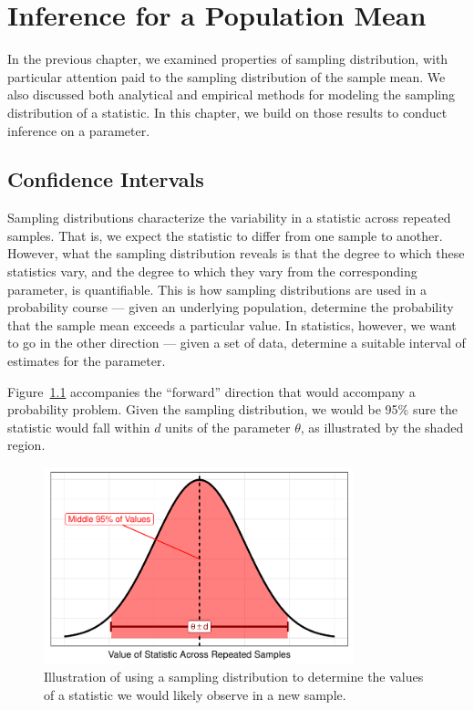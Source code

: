 \documentclass[
  letterpaper,
  DIV=11,
  numbers=noendperiod]{scrreprt}
\theoremstyle{plain}
\theoremstyle{definition}
\theoremstyle{definition}
\theoremstyle{remark}
\begin{document}

\hypertarget{sec-inference}{%
\chapter{Inference for a Population Mean}\label{sec-inference}}

In the previous chapter, we examined properties of sampling
distribution, with particular attention paid to the sampling
distribution of the sample mean. We also discussed both analytical and
empirical methods for modeling the sampling distribution of a statistic.
In this chapter, we build on those results to conduct inference on a
parameter.

\hypertarget{confidence-intervals}{%
\section{Confidence Intervals}\label{confidence-intervals}}

Sampling distributions characterize the variability in a statistic
across repeated samples. That is, we expect the statistic to differ from
one sample to another. However, what the sampling distribution reveals
is that the degree to which these statistics vary, and the degree to
which they vary from the corresponding parameter, is quantifiable. This
is how sampling distributions are used in a probability course --- given
an underlying population, determine the probability that the sample mean
exceeds a particular value. In statistics, however, we want to go in the
other direction --- given a set of data, determine a suitable interval
of estimates for the parameter.

Figure~\ref{fig-inference-samplingdistribution} accompanies the
``forward'' direction that would accompany a probability problem. Given
the sampling distribution, we would be 95\% sure the statistic would
fall within \(d\) units of the parameter \(\theta\), as illustrated by
the shaded region.

\begin{figure}

{\centering \includegraphics[width=0.8\textwidth,height=\textheight]{./images/fig-inference-samplingdistribution-1.pdf}

}

\caption{\label{fig-inference-samplingdistribution}Illustration of using
a sampling distribution to determine the values of a statistic we would
likely observe in a new sample.}

\end{figure}
\end{document}
